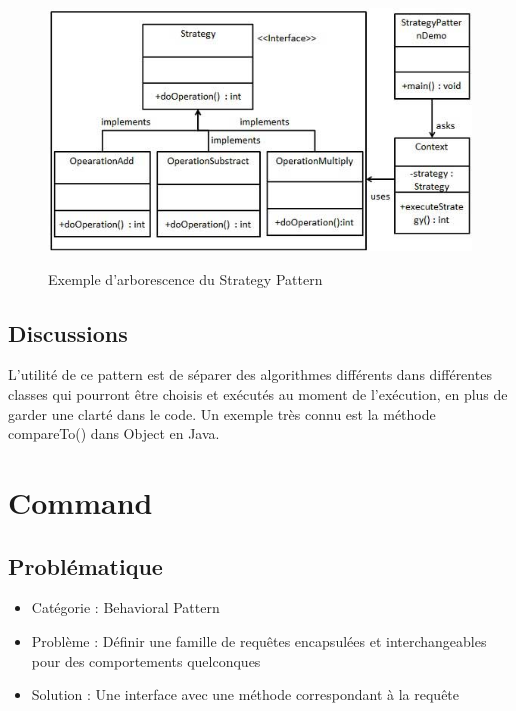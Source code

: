 \begin{figure}[H]
	\centering
	\begin{minipage}[t]{8.0cm}
		\includegraphics[scale=0.4]{Images/strat.jpg}
		\label{s1}
   		\caption{Exemple d'arborescence du Strategy Pattern}
	\end{minipage}
	
\end{figure}


\subsection{Discussions}
L'utilité de ce pattern est de séparer des algorithmes différents dans différentes classes qui pourront être choisis et exécutés au moment de l'exécution, en plus de garder une clarté dans le code.
Un exemple très connu est la méthode compareTo() dans Object en Java.









\section{Command}
\subsection{Problématique}
\begin{itemize}
    \item Catégorie : Behavioral Pattern
    \item Problème : Définir une famille de requêtes encapsulées et interchangeables pour des comportements quelconques 
    \item Solution : Une interface avec une méthode correspondant à la requête
\end{itemize}
